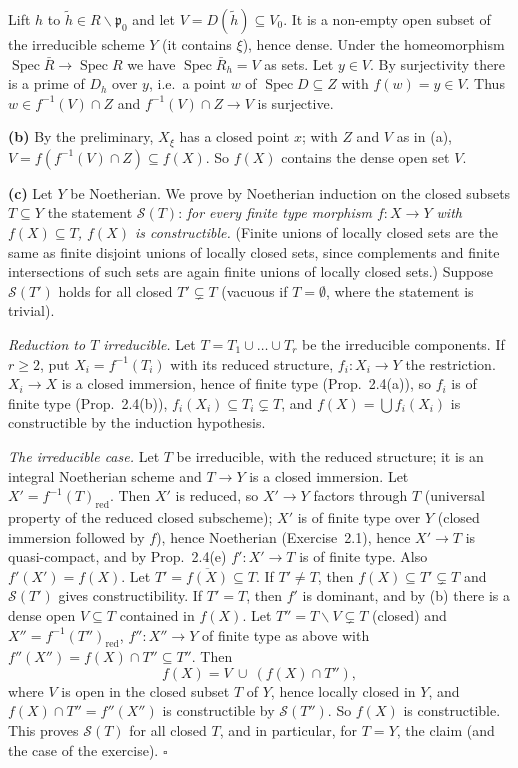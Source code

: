 \documentclass[11pt]{article}
\begin{document}
Lift $h$ to $\tilde h\in R\smallsetminus\mathfrak p_0$ and let $V=D(\tilde h)\subseteq V_0$. It is a non-empty open subset of the irreducible scheme $Y$ (it contains $\xi$), hence dense. Under the homeomorphism $\operatorname{Spec}\bar R\to\operatorname{Spec}R$ we have $\operatorname{Spec}\bar R_h=V$ as sets. Let $y\in V$. By surjectivity there is a prime of $D_h$ over $y$, i.e.\ a point $w$ of $\operatorname{Spec}D\subseteq Z$ with $f(w)=y\in V$. Thus $w\in f^{-1}(V)\cap Z$ and $f^{-1}(V)\cap Z\to V$ is surjective.

\textbf{(b)} By the preliminary, $X_\xi$ has a closed point $x$; with $Z$ and $V$ as in (a), $V=f(f^{-1}(V)\cap Z)\subseteq f(X)$. So $f(X)$ contains the dense open set $V$.

\textbf{(c)} Let $Y$ be Noetherian. We prove by Noetherian induction on the closed subsets $T\subseteq Y$ the statement $\mathcal S(T)$: \emph{for every finite type morphism $f:X\to Y$ with $f(X)\subseteq T$, $f(X)$ is constructible.} (Finite unions of locally closed sets are the same as finite disjoint unions of locally closed sets, since complements and finite intersections of such sets are again finite unions of locally closed sets.) Suppose $\mathcal S(T')$ holds for all closed $T'\subsetneq T$ (vacuous if $T=\emptyset$, where the statement is trivial).

\emph{Reduction to $T$ irreducible.} Let $T=T_1\cup\dots\cup T_r$ be the irreducible components. If $r\ge2$, put $X_i=f^{-1}(T_i)$ with its reduced structure, $f_i:X_i\to Y$ the restriction. $X_i\to X$ is a closed immersion, hence of finite type (Prop.~2.4(a)), so $f_i$ is of finite type (Prop.~2.4(b)), $f_i(X_i)\subseteq T_i\subsetneq T$, and $f(X)=\bigcup f_i(X_i)$ is constructible by the induction hypothesis.

\emph{The irreducible case.} Let $T$ be irreducible, with the reduced structure; it is an integral Noetherian scheme and $T\to Y$ is a closed immersion. Let $X'=f^{-1}(T)_{\operatorname{red}}$. Then $X'$ is reduced, so $X'\to Y$ factors through $T$ (universal property of the reduced closed subscheme); $X'$ is of finite type over $Y$ (closed immersion followed by $f$), hence Noetherian (Exercise~2.1), hence $X'\to T$ is quasi-compact, and by Prop.~2.4(e) $f':X'\to T$ is of finite type. Also $f'(X')=f(X)$. Let $T'=\overline{f(X)}\subseteq T$. If $T'\neq T$, then $f(X)\subseteq T'\subsetneq T$ and $\mathcal S(T')$ gives constructibility. If $T'=T$, then $f'$ is dominant, and by (b) there is a dense open $V\subseteq T$ contained in $f(X)$. Let $T''=T\smallsetminus V\subsetneq T$ (closed) and $X''=f^{-1}(T'')_{\operatorname{red}}$, $f'':X''\to Y$ of finite type as above with $f''(X'')=f(X)\cap T''\subseteq T''$. Then
\[ f(X)=V\ \cup\ (f(X)\cap T''), \]
where $V$ is open in the closed subset $T$ of $Y$, hence locally closed in $Y$, and $f(X)\cap T''=f''(X'')$ is constructible by $\mathcal S(T'')$. So $f(X)$ is constructible. This proves $\mathcal S(T)$ for all closed $T$, and in particular, for $T=Y$, the claim (and the case of the exercise). \hfill$\square$
\end{document}
